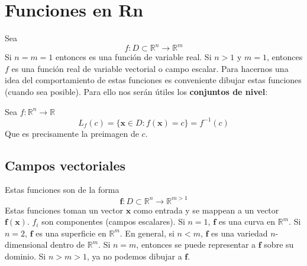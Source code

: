 \documentclass{../Calculo.tex}
\begin{document}
\section{Funciones en Rn }
Sea
$$
f:D \subset \mathbb{R}^n\to \mathbb{R}^m
$$
Si $n=m=1$ entonces es una función de variable real. Si $n>1$ y $m=1$, entonces $f$ es una función real de variable vectorial o campo escalar.
Para hacernos una idea del comportamiento de estas funciones es conveniente dibujar estas funciones (cuando sea posible). Para ello nos serán útiles los \textbf{conjuntos de nivel}:
\begin{defin}
Sea $f: \mathbb{R}^{n}\to \mathbb{R}$
$$
L_{f}(c)=\{ \mathbf{x}\in D : f(\mathbf{x})=c \}=f^{-1}(c)
$$
Que es precisamente la preimagen de $c$.
\end{defin}
\subsection{Campos vectoriales}
Estas funciones son de la forma
$$
\mathbf{f}: D \subset \mathbb{R}^{n} \to \mathbb{R}^{m>1}
$$
Estas funciones toman un vector $\mathbf{x}$ como entrada y se mappean a un vector $\mathbf{f}(\mathbf{x})$.
$f_{i}$ son componentes (campos escalares).
Si $n=1$, $\mathbf{f}$ es una curva en $\mathbb{R}^{m}$.
Si $n=2$, $\mathbf{f}$ es una superficie en $\mathbb{R}^{m}$.
En general, si $n<m$, $\mathbf{f}$ es una variedad $n$-dimensional dentro de $\mathbb{R}^{m}$.
Si $n=m$, entonces se puede representar a $\mathbf{f}$ sobre su dominio.
Si $n > m > 1$, ya no podemos dibujar a $\mathbf{f}$.
\end{document}
